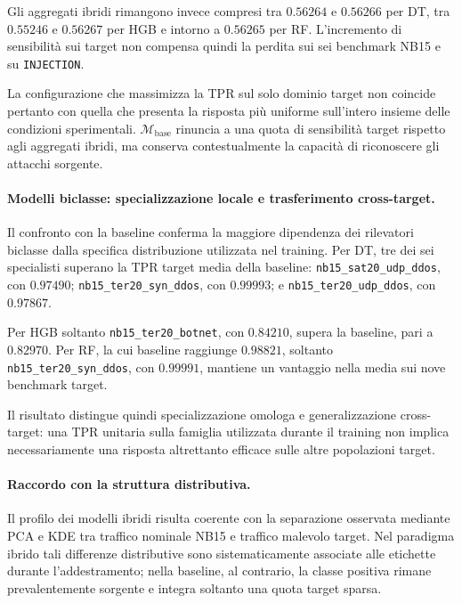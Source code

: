 Gli aggregati ibridi rimangono invece compresi tra $0.56264$ e $0.56266$ per DT, tra $0.55246$ e $0.56267$ per HGB e intorno a $0.56265$ per RF.
L'incremento di sensibilità sui target non compensa quindi la perdita sui sei benchmark NB15 e su \texttt{INJECTION}.

La configurazione che massimizza la TPR sul solo dominio target non coincide pertanto con quella che presenta la risposta più uniforme sull'intero insieme delle condizioni sperimentali. 
$\mathcal{M}_{\mathrm{base}}$ rinuncia a una quota di sensibilità target rispetto agli aggregati ibridi, ma conserva contestualmente la capacità di riconoscere gli attacchi sorgente.

\paragraph{Modelli biclasse: specializzazione locale e trasferimento cross-target.}
Il confronto con la baseline conferma la maggiore dipendenza dei rilevatori biclasse dalla specifica distribuzione utilizzata nel training. 
Per DT, tre dei sei specialisti superano la TPR target media della baseline: \texttt{nb15\_sat20\_udp\_ddos}, con $0.97490$; \texttt{nb15\_ter20\_syn\_ddos}, con $0.99993$; e \newline \texttt{nb15\_ter20\_udp\_ddos}, con $0.97867$.

Per HGB soltanto \texttt{nb15\_ter20\_botnet}, con $0.84210$, supera la baseline, pari a $0.82970$. 
Per RF, la cui baseline raggiunge $0.98821$, soltanto \texttt{nb15\_ter20\_syn\_ddos}, con $0.99991$, mantiene un vantaggio nella media sui nove benchmark target.

Il risultato distingue quindi specializzazione omologa e generalizzazione cross-target: una TPR unitaria sulla famiglia utilizzata durante il training non implica necessariamente una risposta altrettanto efficace sulle altre popolazioni target.

\paragraph{Raccordo con la struttura distributiva.}
Il profilo dei modelli ibridi risulta coerente con la separazione osservata mediante PCA e KDE tra traffico nominale NB15 e traffico malevolo target. 
Nel paradigma ibrido tali differenze distributive sono sistematicamente associate alle etichette durante l'addestramento; nella baseline, al contrario, la classe positiva rimane prevalentemente sorgente e integra soltanto una quota target sparsa.

